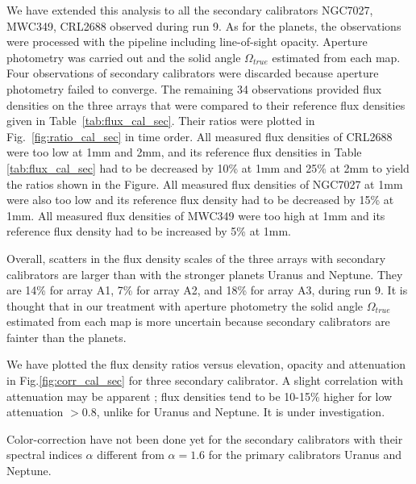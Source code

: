 We have extended this  analysis to all the secondary calibrators NGC7027, MWC349, CRL2688
observed during run 9. As for the planets, the observations were processed with the pipeline including line-of-sight opacity.
Aperture photometry was carried out and the solid angle $\Omega_{true}$  estimated from each map.
Four observations of secondary calibrators were discarded because
aperture photometry failed to converge. The remaining 34 observations  provided flux densities on the three
arrays that were compared to their reference flux densities given in Table~\ref{tab:flux_cal_sec}.
Their  ratios  were plotted in Fig.~\ref{fig:ratio_cal_sec} in time order.
All measured flux densities of CRL2688 were too low  at 1mm and 2mm, and its reference flux densities in Table \ref{tab:flux_cal_sec}  had to be decreased
by 10\% at 1mm and 25\%  at 2mm to yield the ratios shown in the Figure. 
All measured flux densities of NGC7027 at 1mm were also too low and its reference flux density had to be decreased by 15\% at 1mm.
All measured flux densities of MWC349 were too high  at 1mm and its reference flux density had to be increased by 5\% at 1mm.

Overall, scatters in the flux density scales of the three arrays with secondary calibrators
are larger than with the stronger planets Uranus and Neptune. They are
14\% for array A1, 7\% for array A2, and 18\% for array A3, during run 9. It is thought that in our treatment with
aperture photometry the solid angle $\Omega_{true}$
estimated from each map is more uncertain because secondary calibrators are fainter than the planets.

We have plotted the flux density ratios versus elevation, opacity and attenuation in  Fig.\ref{fig:corr_cal_sec} for three
secondary calibrator.
A slight correlation with attenuation may be apparent ; flux densities tend to be  10-15\% higher for low attenuation $> 0.8$,
unlike for Uranus and Neptune. It is under investigation.

Color-correction have not been done yet for the secondary calibrators with their spectral indices $\alpha$ different from $\alpha=1.6$ for
the primary calibrators Uranus and Neptune.


